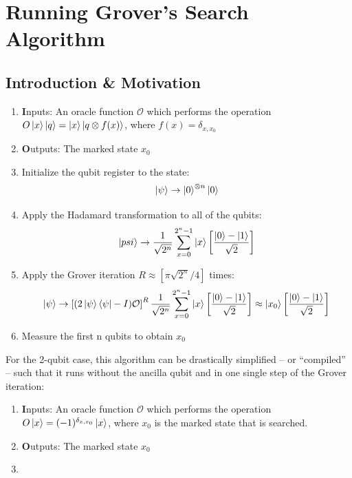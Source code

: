\section{Running Grover's Search Algorithm}


\subsection{Introduction \& Motivation}

\begin{enumerate}
  \item {\textbf Inputs:} An oracle function $\mathcal{O}$ which performs the operation $O\left| x \right>\left| q \right> = \left| x \right>\left| q\otimes f(x) \right>$, where $f(x) = \delta_{x,x_0}$
  \item {\textbf Outputs:} The marked state $x_0$
	\item Initialize the qubit register to the state: 
	$$\left| \psi \right> \to \left| 0 \right>^{\otimes n}\left| 0 \right>$$
	\item Apply the Hadamard transformation to all of the qubits: 
	$$\left| psi \right>\to \frac{1}{\sqrt{2^n}}\sum\limits_{x=0}^{2^n-1} \left| x \right> \left[ \frac{\left| 0 \right>-\left| 1 \right>}{\sqrt{2}} \right]$$
	\item Apply the Grover iteration $R \approx [\pi \sqrt{2^n}/4]$ times:
	$$ \left| \psi \right> \to \left[(2 \left| \psi \right>\left< \psi \right|-I)\mathcal{O}\right]^R \frac{1}{\sqrt{2^n}} \sum\limits_{x=0}^{2^n-1}\left| x \right> \left[ \frac{\left| 0 \right>-\left| 1 \right>}{\sqrt{2}} \right] \approx \left| x_0 \right>\left[\frac{\left| 0 \right>-\left| 1 \right>}{\sqrt{2}}\right] $$
	\item Measure the first n qubits to obtain $x_0$
\end{enumerate}

For the 2-qubit case, this algorithm can be drastically simplified -- or ``compiled'' -- such that it runs without the ancilla qubit and in one single step of the Grover iteration:

\begin{enumerate}
  \item {\textbf Inputs:} An oracle function $\mathcal{O}$ which performs the operation $O\left| x \right> =(-1)^{\delta_{x,x_0}}\left| x \right>$, where $x_0$ is the marked state that is searched.
  \item {\textbf Outputs:} The marked state $x_0$
	\item 
\end{enumerate}

